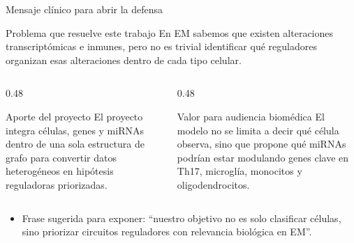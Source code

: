 \begin{frame}{Mensaje cl\'inico para abrir la defensa}
  \begin{block}{Problema que resuelve este trabajo}
    \small
    En EM sabemos que existen alteraciones transcript\'omicas e inmunes, pero no es trivial identificar qu\'e reguladores organizan esas alteraciones dentro de cada tipo celular.
  \end{block}

  \vspace{0.5em}

  \begin{columns}[T]
    \begin{column}{0.48\textwidth}
      \begin{block}{Aporte del proyecto}
        \small
        El proyecto integra c\'elulas, genes y miRNAs dentro de una sola estructura de grafo para convertir datos heterog\'eneos en hip\'otesis reguladoras priorizadas.
      \end{block}
    \end{column}
    \begin{column}{0.48\textwidth}
      \begin{block}{Valor para audiencia biom\'edica}
        \small
        El modelo no se limita a decir qu\'e c\'elula observa, sino que propone qu\'e miRNAs podr\'ian estar modulando genes clave en Th17, microgl\'ia, monocitos y oligodendrocitos.
      \end{block}
    \end{column}
  \end{columns}

  \vspace{0.4em}

  \begin{itemize}
    \item Frase sugerida para exponer: ``nuestro objetivo no es solo clasificar c\'elulas, sino priorizar circuitos reguladores con relevancia biol\'ogica en EM''.
  \end{itemize}
\end{frame}

